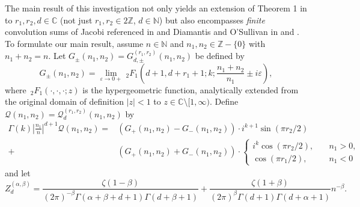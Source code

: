 \documentclass[]{article}
\begin{document}
The main result of this investigation not only yields an extension of Theorem 1 in \cite{FKLR} to $r_1,r_2, d\in\mathbb{C}$ (not just $r_1,r_2\in2\mathbb{Z}$, $d \in \mathbb{N}$) but also encompasses  \textit{finite} convolution sums of Jacobi  referenced in \cite{motohashi1994binary} and  Diamantis and O'Sullivan in \cite[Section 4.2]{diamantis2010kernels} and \cite{o2023identities}. 
To formulate our main result, assume $n \in \mathbb{N}$ and  $n_1, n_2 \in \mathbb{Z}-\{0\}$ with $n_1+n_2 = n$. Let $G_{\pm}(n_1, n_2) = G_{d,\pm}^{(r_1, r_2)}(n_1, n_2)$ be defined by 
\begin{equation}\label{G:def_sksslldffdddd}
G_{\pm}(n_1, n_2) = \lim_{\varepsilon \to 0+} \, _2 F_1 (d+1,d+r_1+1;k;\frac{n_1+n_2}{n_1} \pm  i \varepsilon),
\end{equation} 
where $\, _2 F_1(\cdot, \cdot, \cdot; z)$ is the hypergeometric function, analytically  extended from the original domain of definition $|z|<1$ to $z \in \mathbb{C} \setminus [1, \infty)$. 
Define $\mathcal{Q}(n_1, n_2) = \mathcal{Q}^{(r_1, r_2)}_d(n_1, n_2)$ by
    \begin{equation}\label{eq:Q_convolution_form_main_theorem}
    \begin{split}
  \Gamma(k)  \left|\frac{n_1}{n}\right|^{d+1}  \mathcal{Q}(n_1,n_2) = & \left(  G_+(n_1, n_2)  - G_-(n_1, n_2)  \right) \cdot  i^{k+1} \sin( \pi r_2 / 2) \\
    + &  \left(  G_+(n_1, n_2)  + G_-(n_1, n_2) \right) \cdot \begin{cases}
       i^{k}  \cos(\pi r_2 / 2), \quad &n_1 > 0, \\
             \cos(\pi r_1 / 2), \quad &n_1 < 0
        \end{cases}
    \end{split}
\end{equation} 
and let 
\begin{equation}\label{def:Zabd}
         {Z}^{(\alpha,\beta)}_d =  \frac{ \zeta(1-\beta) }{ (2 \pi )^{-\beta}\Gamma (\alpha + \beta +d+1) \Gamma (d+\beta+1)  } +   \frac{\zeta(1+\beta)}{(2 \pi)^{\beta}\Gamma(d+1) \Gamma(d+\alpha+1)} n^{-\beta }.
\end{equation}
\end{document}
